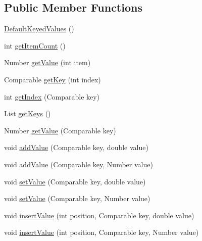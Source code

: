 \subsection*{Public Member Functions}
\begin{DoxyCompactItemize}
\item 
\mbox{\hyperlink{classorg_1_1jfree_1_1data_1_1_default_keyed_values_a8ca19fb8e67e696cf13b1f9d5099a7d9}{Default\+Keyed\+Values}} ()
\item 
int \mbox{\hyperlink{classorg_1_1jfree_1_1data_1_1_default_keyed_values_a82166915731034d230c83ee87177cd3b}{get\+Item\+Count}} ()
\item 
Number \mbox{\hyperlink{classorg_1_1jfree_1_1data_1_1_default_keyed_values_a38fcea7e618e557e028940a48ffc61f0}{get\+Value}} (int item)
\item 
Comparable \mbox{\hyperlink{classorg_1_1jfree_1_1data_1_1_default_keyed_values_adde9e3ec6af9e5fbbf0406f056204b51}{get\+Key}} (int index)
\item 
int \mbox{\hyperlink{classorg_1_1jfree_1_1data_1_1_default_keyed_values_ac6e5a5ef8dc8c3c34e4aac48514d30d5}{get\+Index}} (Comparable key)
\item 
List \mbox{\hyperlink{classorg_1_1jfree_1_1data_1_1_default_keyed_values_ad6896bc409fc73cbdf59a50ac427d261}{get\+Keys}} ()
\item 
Number \mbox{\hyperlink{classorg_1_1jfree_1_1data_1_1_default_keyed_values_a57b0246b343f4831fcb5f306374d198a}{get\+Value}} (Comparable key)
\item 
void \mbox{\hyperlink{classorg_1_1jfree_1_1data_1_1_default_keyed_values_ab603b9f4bc70bd9b8c223a00ed0974f7}{add\+Value}} (Comparable key, double value)
\item 
void \mbox{\hyperlink{classorg_1_1jfree_1_1data_1_1_default_keyed_values_ace54b91d7e6e96f2e14045ebde67b6fd}{add\+Value}} (Comparable key, Number value)
\item 
void \mbox{\hyperlink{classorg_1_1jfree_1_1data_1_1_default_keyed_values_ab85c1eddd862ef8af782b223d0c7ea6b}{set\+Value}} (Comparable key, double value)
\item 
void \mbox{\hyperlink{classorg_1_1jfree_1_1data_1_1_default_keyed_values_ab7f186e0cbc460c387f9e4ff505f99a0}{set\+Value}} (Comparable key, Number value)
\item 
void \mbox{\hyperlink{classorg_1_1jfree_1_1data_1_1_default_keyed_values_a4f27bd55b64e136e44cc8a41deca8db6}{insert\+Value}} (int position, Comparable key, double value)
\item 
void \mbox{\hyperlink{classorg_1_1jfree_1_1data_1_1_default_keyed_values_a0733f8005b0c9cfad30a13c6fabe5c47}{insert\+Value}} (int position, Comparable key, Number value)

\end{DoxyCompactItemize}
